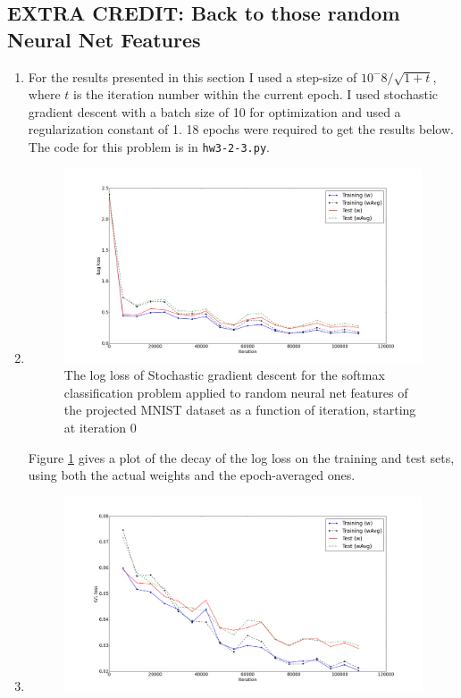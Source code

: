 \documentclass{article}
\begin{document}
\subsection{EXTRA CREDIT: Back to those random Neural Net Features}
\begin{enumerate}
	\item For the results presented in this section I used a step-size of $10^-8 / \sqrt{1+t}$, where $t$ is the iteration number within the current epoch. I used stochastic gradient descent with a batch size of 10 for optimization and used a regularization constant of 1. 18 epochs were required to get the results below. The code for this problem is in \texttt{hw3-2-3.py}.
	\item 
	\begin{figure}
        \centering
        \includegraphics[width=.95\textwidth]{logLossNNFeats18Epochs}
        \caption{The log loss of Stochastic gradient descent for the softmax classification problem applied to random neural net features of the projected MNIST dataset as a function of iteration, starting at iteration 0}
        \label{fig:logLossNNFeats18Epochs}
    \end{figure}
    Figure \ref{fig:logLossNNFeats18Epochs} gives a plot of the decay of the log loss on the training and test sets, using both the actual weights and the epoch-averaged ones.
    \item 
    \begin{figure}
        \centering
        \includegraphics[width=.95\textwidth]{z1LossNNFeats18Epochs}

\end{figure}
\end{enumerate}
\end{document}
